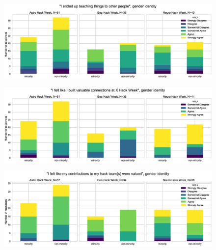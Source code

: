 \documentclass{aastex62}
\begin{document}
\begin{figure}[h!]
\centering
\includegraphics[width=\textwidth]{Q23_2_Q27_stackedbars.eps}
\caption{}
\label{fig:corr6}
\end{figure}

\begin{figure}[h!]
\centering
\includegraphics[width=\textwidth]{Q24_5_Q27_stackedbars.eps}
\caption{}
\label{fig:corr7}
\end{figure}

\begin{figure}[h!]
\centering
\includegraphics[width=\textwidth]{Q19_5_Q27_stackedbars.eps}
\caption{}
\label{fig:corr8}
\end{figure}
\end{document}
